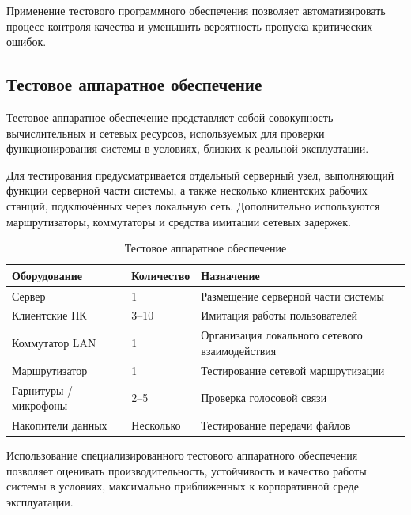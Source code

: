 \documentclass[14pt,a4paper]{extarticle}
\begin{document}
Применение тестового программного обеспечения позволяет автоматизировать процесс контроля качества и уменьшить вероятность пропуска критических ошибок.

\subsection{Тестовое аппаратное обеспечение}

Тестовое аппаратное обеспечение представляет собой совокупность вычислительных и сетевых ресурсов, используемых для проверки функционирования системы в условиях, близких к реальной эксплуатации.

Для тестирования предусматривается отдельный серверный узел, выполняющий функции серверной части системы, а также несколько клиентских рабочих станций, подключённых через локальную сеть. Дополнительно используются маршрутизаторы, коммутаторы и средства имитации сетевых задержек.

\begin{table}[H]
\centering
\caption{Тестовое аппаратное обеспечение}
\begin{tabular}{|p{4cm}|p{3cm}|p{5cm}|}
\hline
\textbf{Оборудование} &
\textbf{Количество} &
\textbf{Назначение} \\
\hline

Сервер &
1 &
Размещение серверной части системы \\
\hline

Клиентские ПК &
3--10 &
Имитация работы пользователей \\
\hline

Коммутатор LAN &
1 &
Организация локального сетевого взаимодействия \\
\hline

Маршрутизатор &
1 &
Тестирование сетевой маршрутизации \\
\hline

Гарнитуры / микрофоны &
2--5 &
Проверка голосовой связи \\
\hline

Накопители данных &
Несколько &
Тестирование передачи файлов \\
\hline

\end{tabular}
\end{table}

Использование специализированного тестового аппаратного обеспечения позволяет оценивать производительность, устойчивость и качество работы системы в условиях, максимально приближенных к корпоративной среде эксплуатации.
\end{document}
